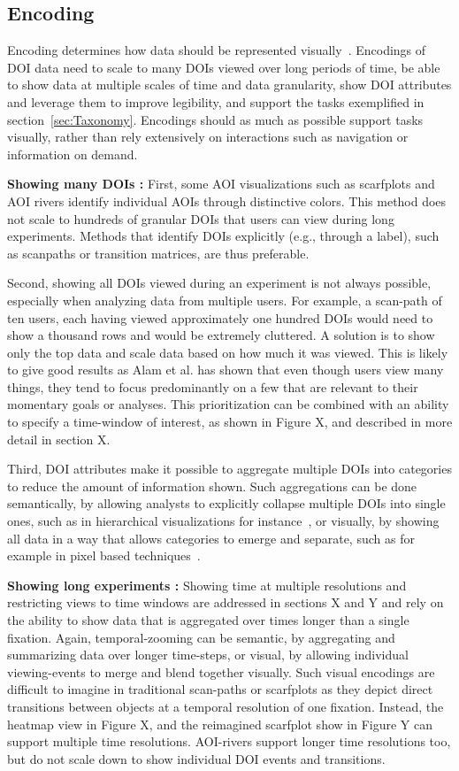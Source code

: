 \subsection{Encoding}
\label{sec:Encoding}
Encoding determines how data should be represented visually~\cite{yi2007toward}. Encodings of DOI data need to scale to many DOIs viewed over long periods of time, be able to show data at multiple scales of time and data granularity, show DOI attributes and leverage them to improve legibility, and support the tasks exemplified in section~\ref{sec:Taxonomy}. Encodings should as much as possible support tasks visually, rather than rely extensively on interactions such as navigation or information on demand.

\textbf{Showing many DOIs :} First, some AOI visualizations such as scarfplots and AOI rivers identify individual AOIs through distinctive colors. This method does not scale to hundreds of granular DOIs that users can view during long experiments. Methods that identify DOIs explicitly (e.g., through a label), such as scanpaths or transition matrices, are thus preferable. 

Second, showing all DOIs viewed during an experiment is not always possible, especially when analyzing data from multiple users. For example, a scan-path of ten users, each having viewed approximately one hundred DOIs would need to show a thousand rows and would be extremely cluttered. A solution is to show only the top data and scale data based on how much it was viewed. This is likely to give good results as Alam et al. has shown that even though users view many things, they tend to focus predominantly on a few that are relevant to their momentary goals or analyses. This prioritization can be combined with an ability to specify a time-window of interest, as shown in Figure X, and described in more detail in section X. 

Third, DOI attributes make it possible to aggregate multiple DOIs into categories to reduce the amount of information shown. Such aggregations can be done semantically, by allowing analysts to explicitly collapse multiple DOIs into single ones, such as in hierarchical visualizations for instance~\cite{kurzhals2014iseecube}, or visually, by showing all data in a way that allows categories to emerge and separate, such as for example in pixel based techniques~\cite{keim2000designing}.

\textbf{Showing long experiments :} Showing time at multiple resolutions and restricting views to time windows are addressed in sections X and Y and rely on the ability to show data that is aggregated over times longer than a single fixation. Again, temporal-zooming can be semantic, by aggregating and summarizing data over longer time-steps, or visual, by allowing individual viewing-events to merge and blend together visually. Such visual encodings are difficult to imagine in traditional scan-paths or scarfplots as they depict direct transitions between objects at a temporal resolution of one fixation. Instead, the heatmap view in Figure X, and the reimagined scarfplot show in Figure Y can support multiple time resolutions. AOI-rivers support longer time resolutions too, but do not scale down to show individual DOI events and transitions.

